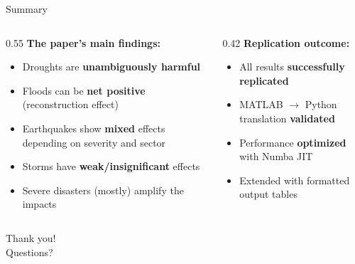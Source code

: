 \documentclass[10pt, aspectratio=169]{beamer}
\begin{document}
\begin{frame}{Summary}
\begin{columns}
\begin{column}{0.55\textwidth}
\textbf{The paper's main findings:}
\begin{itemize}
    \item Droughts are \textbf{unambiguously harmful}
    \item Floods can be \textbf{net positive} (reconstruction effect)
    \item Earthquakes show \textbf{mixed} effects depending on severity and sector
    \item Storms have \textbf{weak/insignificant} effects
    \item Severe disasters (mostly) amplify the impacts
\end{itemize}
\end{column}
\begin{column}{0.42\textwidth}
\textbf{Replication outcome:}
\begin{itemize}
    \item[\checkmark] All results \textbf{successfully replicated}
    \item[\checkmark] MATLAB $\rightarrow$ Python translation \textbf{validated}
    \item[\checkmark] Performance \textbf{optimized} with Numba JIT
    \item[\checkmark] Extended with formatted output tables
\end{itemize}
\end{column}
\end{columns}

\vspace{1em}
\begin{center}
\Large Thank you! \\ \normalsize Questions?
\end{center}
\end{frame}
\end{document}
